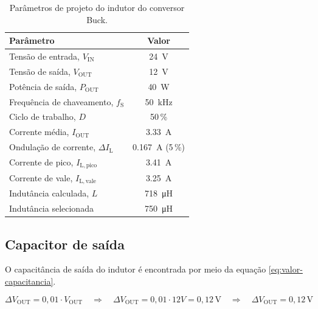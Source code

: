 \begin{table}[ht]
    \centering
    \caption{Parâmetros de projeto do indutor do conversor Buck.}
    \label{tab:parametros-indutor}
    \begin{tabular}{lc}
        \toprule
        \textbf{Parâmetro} & \textbf{Valor} \\
        \midrule
        Tensão de entrada, $V_{\mathrm{IN}}$ 
            & \SI{24}{\volt} \\
        Tensão de saída, $V_{\mathrm{OUT}}$ 
            & \SI{12}{\volt} \\
        Potência de saída, $P_{\mathrm{OUT}}$ 
            & \SI{40}{\watt} \\
        Frequência de chaveamento, $f_{\mathrm{S}}$ 
            & \SI{50}{\kilo\hertz} \\
        Ciclo de trabalho, $D$ 
            & 50\,\% \\
        Corrente média, $I_{\mathrm{OUT}}$ 
            & \SI{3.33}{\ampere} \\
        Ondulação de corrente, $\Delta I_{\mathrm{L}}$ 
            & \SI{0.167}{\ampere} \;(5\,\%) \\
        Corrente de pico, $I_{\mathrm{L,pico}}$ 
            & \SI{3.41}{\ampere} \\
        Corrente de vale, $I_{\mathrm{L,vale}}$ 
            & \SI{3.25}{\ampere} \\
        Indutância calculada, $L$ 
            & \SI{718}{\micro\henry} \\
        Indutância selecionada 
            & \SI{750}{\micro\henry} \\
        \bottomrule
    \end{tabular}
\end{table}

\subsection{Capacitor de saída}

O capacitância de saída do indutor é encontrada por meio da equação \ref{eq:valor-capacitancia}.

\begin{equation}
    \Delta V_{\mathrm{OUT}} = 0{,}01 \cdot V_{\mathrm{OUT}}
    \quad\Rightarrow\quad
    \Delta V_{\mathrm{OUT}} = 0{,}01 \cdot 12 V
    = 0{,}12\,\mathrm{V}
    \quad\Rightarrow\quad
    \boxed{\Delta V_{\mathrm{OUT}} = 0{,}12\,\mathrm{V}}
    \label{eq:ondulacao-corrente}
\end{equation}

